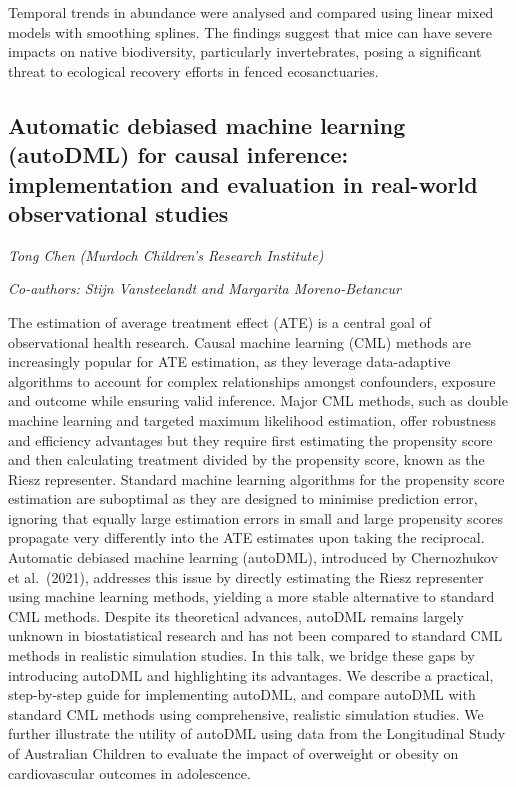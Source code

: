 \documentclass[
]{scrreprt}
\begin{document}
Temporal trends in abundance were analysed and compared using linear
mixed models with smoothing splines. The findings suggest that mice can
have severe impacts on native biodiversity, particularly invertebrates,
posing a significant threat to ecological recovery efforts in fenced
ecosanctuaries.

\subsection{Automatic debiased machine learning (autoDML) for causal
inference: implementation and evaluation in real-world observational
studies}\label{automatic-debiased-machine-learning-autodml-for-causal-inference-implementation-and-evaluation-in-real-world-observational-studies}

\emph{Tong Chen} \emph{(Murdoch Children's Research
Institute)}

\emph{Co-authors: Stijn Vansteelandt and Margarita Moreno-Betancur}

\setlength{\parskip}{0.5em}

The estimation of average treatment effect (ATE) is a central goal of
observational health research. Causal machine learning (CML) methods are
increasingly popular for ATE estimation, as they leverage data-adaptive
algorithms to account for complex relationships amongst confounders,
exposure and outcome while ensuring valid inference. Major CML methods,
such as double machine learning and targeted maximum likelihood
estimation, offer robustness and efficiency advantages but they require
first estimating the propensity score and then calculating treatment
divided by the propensity score, known as the Riesz representer.
Standard machine learning algorithms for the propensity score estimation
are suboptimal as they are designed to minimise prediction error,
ignoring that equally large estimation errors in small and large
propensity scores propagate very differently into the ATE estimates upon
taking the reciprocal. Automatic debiased machine learning (autoDML),
introduced by Chernozhukov et al.~(2021), addresses this issue by
directly estimating the Riesz representer using machine learning
methods, yielding a more stable alternative to standard CML methods.
Despite its theoretical advances, autoDML remains largely unknown in
biostatistical research and has not been compared to standard CML
methods in realistic simulation studies. In this talk, we bridge these
gaps by introducing autoDML and highlighting its advantages. We describe
a practical, step-by-step guide for implementing autoDML, and compare
autoDML with standard CML methods using comprehensive, realistic
simulation studies. We further illustrate the utility of autoDML using
data from the Longitudinal Study of Australian Children to evaluate the
impact of overweight or obesity on cardiovascular outcomes in
adolescence.
\end{document}
